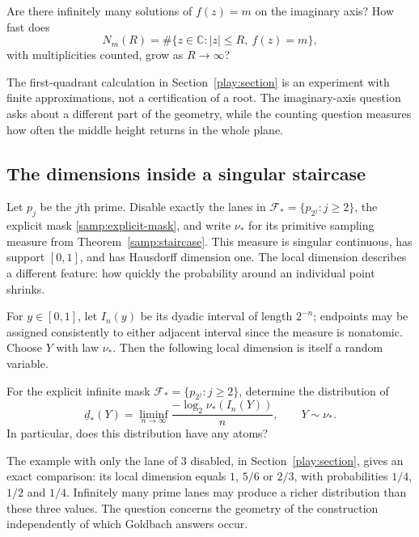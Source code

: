 \begin{question}
\label{play:midpoint-geometry}
Are there infinitely many solutions of $f(z)=m$ on the imaginary
axis?  How fast does
\[
 N_m(R)=\#\{z\in\mathbb C:|z|\le R,\ f(z)=m\},
\]
with multiplicities counted, grow as $R\to\infty$?
\end{question}

The first-quadrant calculation in Section~\ref{play:section} is an
experiment with finite approximations, not a certification of a root.
The imaginary-axis question asks about a different part of the
geometry, while the counting question measures how often the middle
height returns in the whole plane.

\subsection{The dimensions inside a singular staircase}

Let $p_j$ be the $j$th prime.  Disable exactly the lanes in
$\mathcal F_*=\{p_{2^j}:j\ge2\}$, the explicit mask
\eqref{samp:explicit-mask}, and write $\nu_*$ for its primitive
sampling measure from Theorem~\ref{samp:staircase}.  This measure is
singular continuous, has support $[0,1]$, and has Hausdorff dimension
one.  The local dimension describes a different feature: how quickly
the probability around an individual point shrinks.

For $y\in[0,1]$, let $I_n(y)$ be its dyadic interval of length
$2^{-n}$; endpoints may be assigned consistently to either adjacent
interval since the measure is nonatomic.  Choose $Y$ with law
$\nu_*$.  Then the following local dimension is itself a random
variable.

\begin{question}
\label{play:local-dimensions}
For the explicit infinite mask
$\mathcal F_* =\{p_{2^j}:j\ge2\}$, determine the distribution of
\[
 \underline d_*(Y)=\liminf_{n\to\infty}
       \frac{-\log_2\nu_*(I_n(Y))}{n},\qquad Y\sim\nu_*.
\]
In particular, does this distribution have any atoms?
\end{question}

The example with only the lane of $3$ disabled, in
Section~\ref{play:section}, gives an exact comparison: its local
dimension equals $1$, $5/6$ or $2/3$, with probabilities $1/4$,
$1/2$ and $1/4$.  Infinitely many prime lanes may produce a richer
distribution than these three values.  The question concerns the
geometry of the construction independently of which Goldbach
answers occur.
